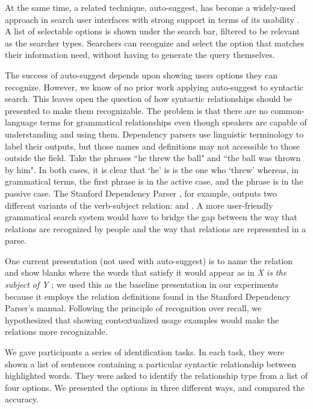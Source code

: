 At the same time, a related technique, auto-suggest, has become a widely-used approach in search user interfaces with strong support in terms of its usability \cite{hearst2009search}. A list of selectable options is shown under the search bar, filtered to be relevant as the searcher types. Searchers can recognize and select the option that matches their information need, without having to generate the query themselves.

The success of auto-suggest depends upon showing users options they can recognize. However, we know of no prior work applying auto-suggest to syntactic search. This leaves open the question of how syntactic relationships should be presented to make them recognizable. The problem is that there are no common-language terms for grammatical relationships even though speakers are capable of understanding and using them. Dependency parsers use linguistic terminology to label their outputs, but those names and definitions may not accessible to those outside the field. Take the phrases ``he threw the ball" and ``the ball was thrown by him". In both cases, it is clear that `he' is is the one who `threw' whereas, in grammatical terms, the first phrase is in the active case, and the phrase is in the passive case. The Stanford Dependency Parser \cite{klein_accurate_2003}, for example, outputs two different variants of the verb-subject relation:  and . A more user-friendly grammatical search system would have to bridge the gap between the way that relations are recognized by people and the way that relations are represented in a parse.

One current presentation (not used with auto-suggest) is to name the relation and show blanks where the words that satisfy it would appear as in \emph{X is the subject of Y} \cite{muralidharan2013supporting_anon}; we used this as the baseline presentation in our experiments because it employs the relation definitions found in the Stanford Dependency Parser's manual. Following the principle of recognition over recall, we hypothesized that showing contextualized usage examples would make the relations more recognizable.

We gave participants a series of identification tasks. In each task, they were shown a list of sentences containing a particular syntactic relationship between highlighted words. They were asked to identify the relationship type from a list of four options. We presented the options in three different ways, and compared the accuracy.

